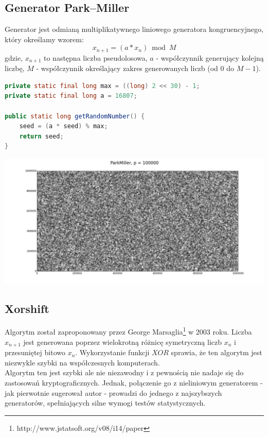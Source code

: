 \documentclass[a4paper, 11pt]{article} %
\begin{document}
\subsection{Generator Park–Miller}
Generator jest odmianą multiplikatywnego liniowego generatora kongruencyjnego, który określamy wzorem:
\[ x_{n+1} = (a * x_{n}) \bmod M \]
gdzie, $x_{n+1}$ to następna liczba pseudolosowa, $a$ - współczynnik generujący kolejną liczbę, $M$ - współczynnik określający zakres generowanych liczb (od $0$ do $M-1$).
\begin{lstlisting}[style=mystyle, language=java, frame=single, caption = Generowanie następnej liczby pseudolosowej przez algorytm Parka-Millera.]
private static final long max = ((long) 2 << 30) - 1;
private static final long a = 16807;

public static long getRandomNumber() {
    seed = (a * seed) % max;
    return seed;
}
\end{lstlisting}
\includegraphics[width=\linewidth]{img/pm-1.png}
\subsection{Xorshift}
Algorytm został zaproponowany przez George Marsaglia\footnote{http://www.jstatsoft.org/v08/i14/paper} w 2003 roku. Liczba $x_{n+1}$ jest generowana poprzez wielokrotną różnicę symetryczną liczb $x_{n}$ i przesuniętej bitowo $x_{n}$. Wykorzystanie funkcji $XOR$ sprawia, że ten algorytm jest niezwykle szybki na współczesnych komputerach.
\\
Algorytm ten jest szybki ale nie niezawodny i z pewnością nie nadaje się do zastosowań kryptograficznych. Jednak, połączenie go z nieliniowym generatorem - jak pierwotnie sugerował autor - prowadzi do jednego z najszybszych generatorów, spełniających silne wymogi testów statystycznych.
\end{document}
